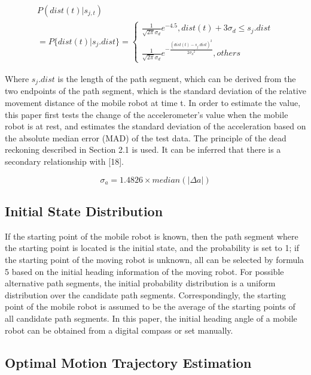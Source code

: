 \documentclass{llncs}
\begin{document}
\begin{equation}
\begin{array}{l}
P(dist(t)|{s_{j,t}})\\
= P\{ dist(t)|{s_j}.dist\}  = \left\{ {\begin{array}{*{20}{l}}
	{\frac{1}{{\sqrt {2\pi } {\sigma _d}}}{e^{ - 4.5}},dist(t) + 3{\sigma _d} \le {s_j}.dist}\\
	{\frac{1}{{\sqrt {2\pi } {\sigma _d}}}{e^{ - \frac{{{{(dist(t) - {s_j}.dist)}^2}}}{{2{\sigma _d}^2}}}},others}
	\end{array}} \right.
\end{array}
\end{equation}

Where ${s_j}.dist$ is the length of the path segment, which can be derived from the two endpoints of the path segment, which is the standard deviation of the relative movement distance of the mobile robot at time t. In order to estimate the value, this paper first tests the change of the accelerometer's value when the mobile robot is at rest, and estimates the standard deviation of the acceleration based on the absolute median error (MAD) of the test data. The principle of the dead reckoning described in Section 2.1 is used. It can be inferred that there is a secondary relationship with [18].

\begin{equation}
	{\sigma _a} = 1.4826 \times median(\left| {\Delta a} \right|)
\end{equation}

\subsection{Initial State Distribution}

If the starting point of the mobile robot is known, then the path segment where the starting point is located is the initial state, and the probability is set to 1; if the starting point of the moving robot is unknown, all can be selected by formula 5 based on the initial heading information of the moving robot. For possible alternative path segments, the initial probability distribution is a uniform distribution over the candidate path segments. Correspondingly, the starting point of the mobile robot is assumed to be the average of the starting points of all candidate path segments. In this paper, the initial heading angle of a mobile robot can be obtained from a digital compass or set manually.

\subsection{Optimal Motion Trajectory Estimation}
\end{document}
